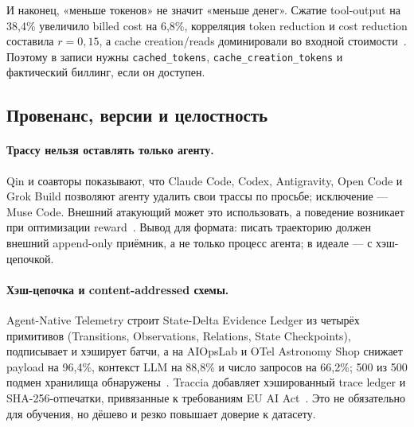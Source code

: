 \documentclass[11pt,a4paper]{article}
\begin{document}
И наконец, «меньше токенов» не значит «меньше денег». Сжатие tool-output
на 38,4\% увеличило billed cost на 6,8\%, корреляция token reduction и
cost reduction составила $r=0,15$, а cache creation/reads доминировали во
входной стоимости~\cite{weinberger2026tokenreduction}. Поэтому в записи
нужны \texttt{cached\_tokens}, \texttt{cache\_creation\_tokens} и
фактический биллинг, если он доступен.

\subsection{Провенанс, версии и целостность}

\paragraph{Трассу нельзя оставлять только агенту.}
Qin и соавторы показывают, что Claude Code, Codex, Antigravity, Open Code
и Grok Build позволяют агенту удалить свои трассы по просьбе; исключение —
Muse Code. Внешний атакующий может это использовать, а поведение возникает
при оптимизации reward~\cite{qin2026tamper}. Вывод для формата: писать
траекторию должен внешний append-only приёмник, а не только процесс
агента; в идеале — с хэш-цепочкой.

\paragraph{Хэш-цепочка и content-addressed схемы.}
Agent-Native Telemetry строит State-Delta Evidence Ledger из четырёх
примитивов (Transitions, Observations, Relations, State Checkpoints),
подписывает и хэширует батчи, а на AIOpsLab и OTel Astronomy Shop снижает
payload на 96,4\%, контекст LLM на 88,8\% и число запросов на 66,2\%;
500 из 500 подмен хранилища обнаружены~\cite{he2026atp}. Traccia добавляет
хэшированный trace ledger и SHA-256-отпечатки, привязанные к требованиям
EU AI Act~\cite{naik2026traccia}. Это не обязательно для обучения, но
дёшево и резко повышает доверие к датасету.
\end{document}

